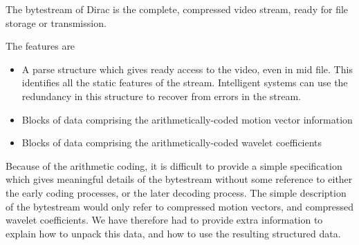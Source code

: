 The bytestream of Dirac is the complete, compressed video stream, ready
for file storage or transmission.

The features are

\begin{itemize}
    \item A parse structure which gives ready access to the video, even
    in mid file. This identifies all the static features of the stream.
    Intelligent systems can use the redundancy in this structure to
    recover from errors in the stream.

    \item Blocks of data comprising the arithmetically-coded motion
    vector information

    \item Blocks of data comprising the arithmetically-coded wavelet
    coefficients
\end{itemize}

Because of the arithmetic coding, it is difficult to provide a simple
specification which gives meaningful details of the bytestream without
some reference to either the early coding processes, or the later
decoding process. The simple description of the bytestream would only
refer to compressed motion vectors, and compressed wavelet coefficients.
We have therefore had to provide extra information to explain how to
unpack this data, and how to use the resulting structured data.

